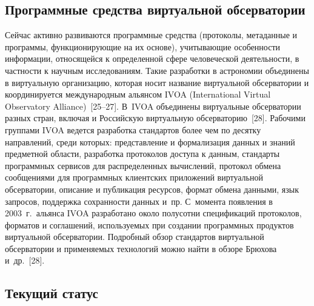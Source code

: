 \begin{multicols}{2}
\vspace*{-9pt}

\section{Программные средства виртуальной обсерватории}

\vspace*{-2pt}

      Сейчас активно развиваются программные средства (протоколы, метаданные и 
программы, функционирующие на их основе), учитывающие особенности информации, 
относящейся к определенной сфере человеческой деятельности, в частности к научным 
исследованиям. Такие разработки в астрономии объединены в виртуальную организацию, 
которая носит название виртуальной обсерватории и координируется международным 
альянсом IVOA ({International Virtual Observatory Alliance})~[25--27]. В~IVOA 
объединены виртуальные обсерватории разных стран, включая и Российскую виртуальную 
обсерваторию~[28]. Рабочими группами IVOA ведется разработка стандартов более чем по 
десятку направлений, среди которых: представление и формализация данных и знаний 
предметной области, разработка протоколов доступа к данным, стандарты программных 
сервисов для распределенных вычислений, протокол обмена сообщениями для программных 
клиентских приложений виртуальной обсерватории, описание и публикация ресурсов, 
формат обмена данными, язык запросов, поддержка сохранности данных и~пр. С~момента 
появления в 2003~г.\ альянса IVOA разработано около полусотни спецификаций 
протоколов, форматов и соглашений, используемых при создании программных продуктов 
виртуальной обсерватории. Подробный обзор стандартов виртуальной обсерватории и 
применяемых технологий можно найти в обзоре Брюхова и~др.~[28].

\vspace*{-2pt}

\subsection{Текущий статус}


\end{multicols}
